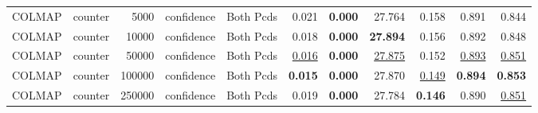 \begin{table}[H]
\begin{tabular}{llrllrrrrrr}
COLMAP & counter & 5000 & confidence & Both Pcds & 0.021 & \textbf{0.000} & 27.764 & 0.158 & 0.891 & 0.844 \\
COLMAP & counter & 10000 & confidence & Both Pcds & 0.018 & \textbf{0.000} & \textbf{27.894} & 0.156 & 0.892 & 0.848 \\
COLMAP & counter & 50000 & confidence & Both Pcds & \underline{0.016} & \textbf{0.000} & \underline{27.875} & 0.152 & \underline{0.893} & \underline{0.851} \\
COLMAP & counter & 100000 & confidence & Both Pcds & \textbf{0.015} & \textbf{0.000} & 27.870 & \underline{0.149} & \textbf{0.894} & \textbf{0.853} \\
COLMAP & counter & 250000 & confidence & Both Pcds & 0.019 & \textbf{0.000} & 27.784 & \textbf{0.146} & 0.890 & \underline{0.851} \\
\bottomrule
\end{tabular}
\end{table}